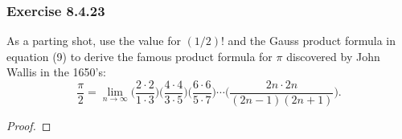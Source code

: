 \subsubsection{Exercise 8.4.23} As a parting shot, use the value for \( (1/2)! \) and the Gauss product formula in equation (9) to derive the famous product formula for \( \pi  \) discovered by John Wallis in the 1650's:
\[ \frac{ \pi  }{  2 } = \lim_{ n \to \infty  } \Big( \frac{ 2 \cdot 2  }{ 1 \cdot 3  }  \Big) \Big( \frac{ 4 \cdot 4  }{ 3 \cdot 5  }  \Big) \Big(  \frac{ 6 \cdot 6  }{ 5 \cdot 7  }  \Big) \dotsb \Big( \frac{ 2n \cdot 2n  }{ (2n-1)(2n+1) }  \Big).\]
\begin{proof}

\end{proof}
















